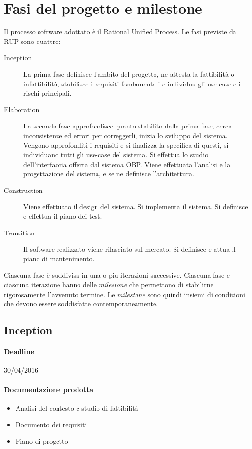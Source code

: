\section{Fasi del progetto e milestone}

Il processo software adottato \`e il Rational Unified Process.
Le fasi previste da RUP sono quattro:
\begin{description}
	\item[Inception]
	La prima fase definisce l'ambito del progetto, ne attesta la fattibilit\`a o infattibilit\`a, stabilisce i requisiti fondamentali e individua gli use-case e i rischi principali.
	\item[Elaboration]
	La seconda fase approfondisce quanto stabilito dalla prima fase, cerca inconsistenze ed errori per correggerli, inizia lo sviluppo del sistema.
	Vengono approfonditi i requisiti e si finalizza la specifica di questi, si individuano tutti gli use-case del sistema.
	Si effettua lo studio dell'interfaccia offerta dal sistema OBP.
	Viene effettuata l'analisi e la progettazione del sistema, e se ne definisce l'architettura.
	\item[Construction]
	Viene effettuato il design del sistema.
	Si implementa il sistema.
	Si definisce e effettua il piano dei test.
	\item[Transition]
	Il software realizzato viene rilasciato sul mercato.
	Si definisce e attua il piano di mantenimento.
\end{description}

Ciascuna fase \`e suddivisa in una o pi\`u iterazioni successive.
Ciascuna fase e ciascuna iterazione hanno delle \emph{milestone} che permettono di stabilirne rigorosamente l'avvenuto termine.
Le \emph{milestone} sono quindi insiemi di condizioni che devono essere soddisfatte contemporaneamente.

\subsection{Inception}

\paragraph{Deadline}
30/04/2016.

\paragraph{Documentazione prodotta}
\begin{itemize}
	\item Analisi del contesto e studio di fattibilit\`a
	\item Documento dei requisiti
	\item Piano di progetto
\end{itemize}

